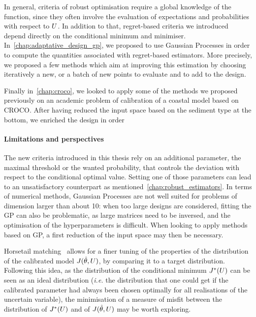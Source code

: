 \documentclass[../../Main_ManuscritThese.tex]{subfiles}
\begin{document}
In general, criteria of robust optimisation require a global
knowledge of the function, since they often involve the evaluation of
expectations and probabilities with respect to $U$. In addition to
that, regret-based criteria we introduced depend directly on the
conditional minimum and minimiser. In~\cref{chap:adaptative_design_gp},
we proposed to use Gaussian Processes in order to compute the
quantities associated with regret-based estimators. More precisely, we
proposed a few methods which aim at improving this estimation by
choosing iteratively a new, or a batch of new points to evaluate and
to add to the design.

Finally in~\cref{chap:croco}, we looked to apply some of the methods
we proposed previously on an academic problem of calibration of a
coastal model based on CROCO. After having reduced the input space
based on the sediment type at the bottom, we enriched the design in order 

\paragraph{Limitations and perspectives}
The new criteria introduced in this thesis rely on an additional
parameter, the maximal threshold or the wanted probability, that
controls the deviation with respect to the conditional optimal
value. Setting one of those parameters can lead to an unsatisfactory
counterpart as mentioned~\cref{chap:robust_estimators}. In terms of
numerical methods, Gaussian Processes are not well suited for problems
of dimension larger than about \num{10}: when too large designs are
considered, fitting the GP can also be problematic, as large matrices
need to be inversed, and the optimisation of the hyperparameters is
difficult.  When looking to apply methods based on GP, a first
reduction of the input space may then be necessary.

Horsetail matching~\cite{cook_extending_2017,cook_horsetail_2018}
allows for a finer tuning of the properties of the distribution of the
calibrated model $J(\hat{\theta},U)$, by comparing it to a target
distribution. Following this idea, as the distribution of the
conditional minimum $J^*(U)$ can be seen as an ideal distribution
(\emph{i.e.} the distribution that one could get if the calibrated
parameter had always been chosen optimally for all realisations of the
uncertain variable), the minimisation of a measure of misfit between
the distribution of $J^*(U)$ and of $J(\hat{\theta},U)$ may be worth
exploring.

\clearpage
\subfileLocal{
	\pagestyle{empty}
	
        
}

\end{document}
